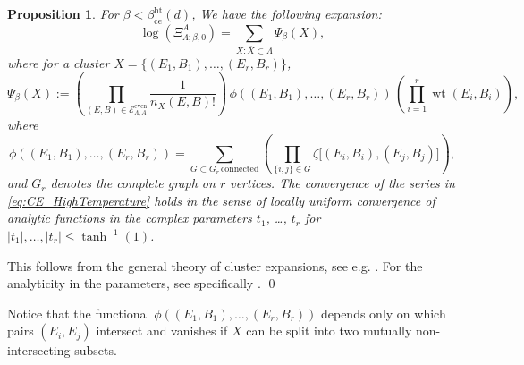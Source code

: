 \documentclass{amsart}
\DeclareMathOperator\wt{wt}
\numberwithin{equation}{section}
\newtheorem{proposition}[theorem]{Proposition}
\theoremstyle{remark}
\renewenvironment{proof}[1][Proof]{\begin{trivlist}
\item[\hskip \labelsep {\bfseries #1:}]}{\qed\end{trivlist}}
\begin{document}
\begin{proposition}
For $\beta<\beta^{\text{ht}}_{\text{ce}}(d)$, We have the following expansion:
\begin{equation}
 \log(\Xi^A_{\Lambda;\beta,0})
= \sum_{X: \overline{X} \subset \Lambda} \Psi_{\beta}(X),
\label{eq:CE_HighTemperature}
\end{equation}
where for a cluster $X= \{(E_1,B_1),\dots,(E_r,B_r)\}$,
$$\Psi_\beta(X):= \left( \prod_{(E,B) \in \mathcal{E}^\text{even}_{\Lambda,A}}
 \frac{1}{n_X(E,B)!} \right)  \, \phi((E_1,B_1),\dots,(E_r,B_r)) \, \left( \prod_{ i=1}^r \wt(E_i,B_i) \right),$$
where
$$\phi(( E_1,B_1),\dots,(E_r,B_r)) =\sum_{G \subset G_r\, \text{connected}} \left( \prod_{\{i,j\} \in G}
\zeta\big[(E_i,B_i),(E_j,B_j)\big] \right),$$
and $G_r$ denotes the complete graph on $r$ vertices.
The convergence of the series in \cref{eq:CE_HighTemperature} holds in the sense 
of locally uniform convergence of analytic functions in the complex parameters $t_1$, \dots, $t_r$
for $|t_1|,\dots,|t_r| \le \tanh^{-1}(1)$.
\label{prop:CE_HighTemperature}
\end{proposition}
\begin{proof}
This follows from the general theory of cluster expansions, see e.g. \cite[Chapter 5]{Velenik}.
For the analyticity in the parameters, see specifically \cite[Section 5.5]{Velenik}.
\end{proof}
Notice that the functional $\phi((E_1,B_1),\dots,(E_r,B_r))$ depends only on which pairs $(E_i,E_j)$ intersect
and vanishes if $X$ can be split into two mutually non-intersecting subsets.
\end{document}
